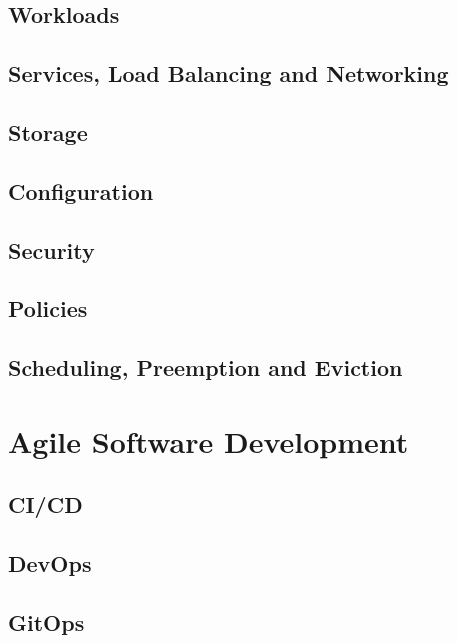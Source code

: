 \subsection{Workloads}
\subsection{Services, Load Balancing and Networking}
\subsection{Storage}
\subsection{Configuration}
\subsection{Security}
\subsection{Policies}
\subsection{Scheduling, Preemption and Eviction}

\section{Agile Software Development}
\subsection{CI/CD}
\subsection{DevOps}
\subsection{GitOps}